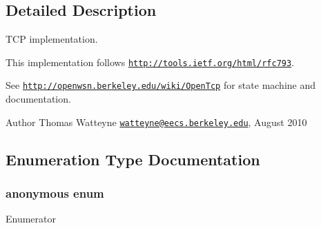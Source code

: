 \subsection{Detailed Description}
T\+CP implementation. 

This implementation follows \href{http://tools.ietf.org/html/rfc793}{\tt http\+://tools.\+ietf.\+org/html/rfc793}.

See \href{http://openwsn.berkeley.edu/wiki/OpenTcp}{\tt http\+://openwsn.\+berkeley.\+edu/wiki/\+Open\+Tcp} for state machine and documentation.

\begin{DoxyAuthor}{Author}
Thomas Watteyne \href{mailto:watteyne@eecs.berkeley.edu}{\tt watteyne@eecs.\+berkeley.\+edu}, August 2010 
\end{DoxyAuthor}


\subsection{Enumeration Type Documentation}
\subsubsection[{\texorpdfstring{anonymous enum}{anonymous enum}}]{\setlength{\rightskip}{0pt plus 5cm}anonymous enum}\hypertarget{group___open_tcp_ga8feb5a39a55448c86e0dfc20f53a6c1d}{}\label{group___open_tcp_ga8feb5a39a55448c86e0dfc20f53a6c1d}
\begin{Desc}
\item[Enumerator]\par
\begin{description}
\item[{\em 
T\+C\+P\+\_\+\+I\+N\+I\+T\+I\+A\+L\+\_\+\+S\+E\+Q\+N\+UM\hypertarget{group___open_tcp_gga8feb5a39a55448c86e0dfc20f53a6c1da2f1c431b36e504d5b111a14dfb520c1d}{}\label{group___open_tcp_gga8feb5a39a55448c86e0dfc20f53a6c1da2f1c431b36e504d5b111a14dfb520c1d}
}]\item[{\em 
T\+C\+P\+\_\+\+T\+I\+M\+E\+O\+UT\hypertarget{group___open_tcp_gga8feb5a39a55448c86e0dfc20f53a6c1da0558eaf1678efcce0e1eea1dc6a0098a}{}\label{group___open_tcp_gga8feb5a39a55448c86e0dfc20f53a6c1da0558eaf1678efcce0e1eea1dc6a0098a}
}]\end{description}
\end{Desc}


